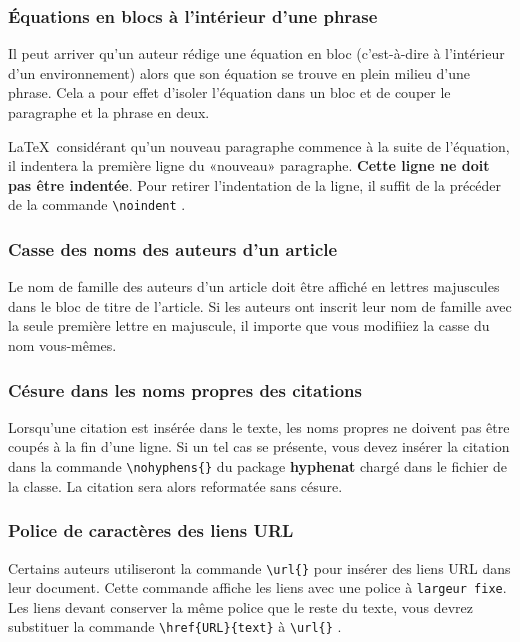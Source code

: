\documentclass[french]{article}
\newcommand{\cmd}[1]{%
	\texttt{\textbackslash#1\{\}}
}
\newcommand{\dec}[1]{%
	\texttt{\textbackslash#1}
}
\begin{document}
			\subsubsection{Équations en blocs à l'intérieur d'une phrase}
			
			Il peut arriver qu'un auteur rédige une équation en bloc (c'est-à-dire à l'intérieur d'un
			environnement) alors que son équation se trouve en plein milieu d'une phrase. Cela a pour effet
			d'isoler l'équation dans un bloc et de couper le paragraphe et la phrase en deux.
			
			\LaTeX\ considérant qu'un nouveau paragraphe commence à la suite de l'équation, il indentera
			la première ligne du «nouveau» paragraphe. \textbf{Cette ligne ne doit pas être indentée}.
			Pour retirer l'indentation de la ligne, il suffit de la précéder de la commande \dec{noindent}.
			
			\subsubsection{Casse des noms des auteurs d'un article}
		
			Le nom de famille des auteurs d'un article doit être affiché en lettres majuscules dans le bloc de titre
			de l'article. Si les auteurs ont inscrit leur nom de famille avec la seule première lettre en majuscule,
			il importe que vous modifiiez la casse du nom vous-mêmes.
			
			\subsubsection{Césure dans les noms propres des citations}
		
			Lorsqu'une citation est insérée dans le texte, les noms propres ne doivent pas être coupés à
			la fin d'une ligne. Si un tel cas se présente, vous devez insérer la citation dans la
			commande \cmd{nohyphens} du package \textbf{hyphenat} chargé dans le fichier de la classe. La
			citation sera alors reformatée sans césure.
			
			\subsubsection{Police de caractères des liens URL}
			
			Certains auteurs utiliseront la commande \cmd{url} pour insérer des liens URL dans leur document.
			Cette commande affiche les liens avec une police à \texttt{largeur fixe}. Les liens devant
			conserver la même police que le reste du texte, vous devrez substituer la commande
			\verb|\href{URL}{text}| à \cmd{url}.
			
\end{document}
